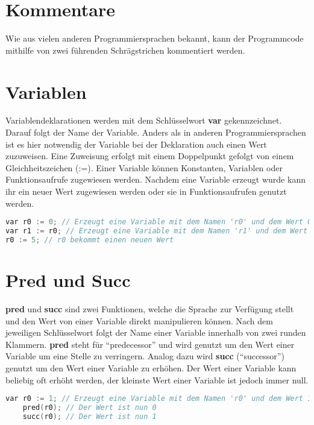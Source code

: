 \section{Kommentare}
Wie aus vielen anderen Programmiersprachen bekannt, kann der Programmcode mithilfe von zwei führenden Schrägstrichen  kommentiert werden.

\section{Variablen}
Variablendeklarationen werden mit dem Schlüsselwort \textbf{var} gekennzeichnet. Darauf folgt der Name der Variable. Anders als in anderen Programmiersprachen ist es hier notwendig der Variable bei der Deklaration auch einen Wert zuzuweisen. Eine Zuweisung erfolgt mit einem Doppelpunkt gefolgt von einem Gleichheitszeichen (:=). Einer Variable können Konstanten, Variablen oder Funktionsaufrufe zugewiesen werden. Nachdem eine Variable erzeugt wurde kann ihr ein neuer Wert zugewiesen werden oder sie in Funktionsaufrufen genutzt werden.

\begin{lstlisting}[language=c, caption=Variablennutzung in While, label={lst:while-var-defdec}]
var r0 := 0; // Erzeugt eine Variable mit dem Namen 'r0' und dem Wert 0
var r1 := r0; // Erzeugt eine Variable mit dem Namen 'r1' und dem Wert von r0
r0 := 5; // r0 bekommt einen neuen Wert
\end{lstlisting}

\section{Pred und Succ}
\textbf{pred} und \textbf{succ} sind zwei Funktionen, welche die Sprache zur Verfügung stellt und den Wert von einer Variable direkt manipulieren können. Nach dem jeweiligen Schlüsselwort folgt der Name einer Variable innerhalb von zwei runden Klammern. \textbf{pred} steht für \enquote{predecessor} und wird genutzt um den Wert einer Variable um eine Stelle zu verringern. Analog dazu wird \textbf{succ} (\enquote{successor}) genutzt um den Wert einer Variable zu erhöhen. Der Wert einer Variable kann beliebig oft erhöht werden, der kleinste Wert einer Variable ist jedoch immer null.

\begin{lstlisting}[language=c, caption=pred und succ in While, label={lst:while-var-defdec}]
	var r0 := 1; // Erzeugt eine Variable mit dem Namen 'r0' und dem Wert 1
	pred(r0); // Der Wert ist nun 0
	succ(r0); // Der Wert ist nun 1
\end{lstlisting}

